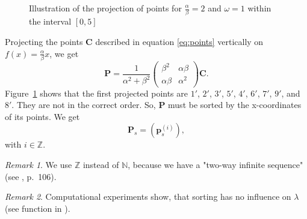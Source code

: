 \documentclass[11pt]{article}
\theoremstyle{remark}
\newtheorem{remark}{Remark}
\begin{document}
\begin{figure}[htbp]
    \centering
	\caption{Illustration of the projection of points for $\frac{\alpha}{\beta} = 2$ and $\omega = 1$ within the interval $[0, 5]$}
    \label{fig:a2o1}
\end{figure}
%
Projecting the points $\mathbf{C}$ described in equation \ref{eq:points} vertically on $f(x) = \frac{\alpha}{\beta} x$, we get
%
\begin{equation}
\mathbf{P}
= \frac{1}{\alpha^2 + \beta^2} \begin{pmatrix} \beta^2 & \alpha \beta \\ \alpha \beta & \alpha^2 \end{pmatrix} \mathbf{C}.\label{eq:c}
\end{equation}
%
Figure~\ref{fig:a2o1} shows that the first projected points are $1'$, $2'$, $3'$, $5'$, $4'$, $6'$, $7'$, $9'$, and $8'$. They are not in the correct order. So, $\mathbf{P}$ must be sorted by the x-coordinates of its points. We get
\begin{equation}
\mathbf{P}_s = \left(\mathbf{p}_s^{(i)} \right),\label{eq:sort}
\end{equation}
with $i \in \mathbb{Z}$.
%
\begin{remark}
We use $\mathbb{Z}$ instead of $\mathbb{N}$, because we have a "two-way infinite sequence" (see \cite{Senechal2009}, p.~106).
\end{remark}
%
\begin{remark}
Computational experiments show, that sorting has no influence on $\lambda$ (see \langc function  in \cite{Kunert2025}).
\end{remark}
\end{document}
